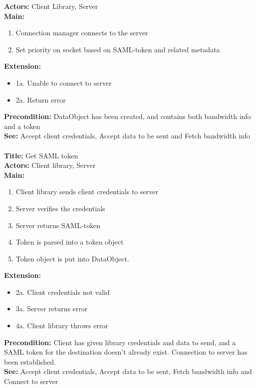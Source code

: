 		\textbf{Actors:} Client Library, Server \\
		\textbf{Main:}
		\begin{enumerate}	
			\item Connection manager connects to the server
			\item Set priority on socket based on SAML-token and related metadata
		\end{enumerate}
		\textbf{Extension:}
		\begin{itemize}
			  \item[] 1a. Unable to connect to server
			  \item[] 2a. Return error
		\end{itemize}
		\textbf{Precondition:} DataObject has been created, and contains both bandwidth info and a token \\
		\textbf{See:} Accept client credentials, Accept data to be sent and Fetch bandwidth info
		\\\\
		\textbf{Title:} Get SAML token \\
		\textbf{Actors:} Client library, Server \\
		\textbf{Main:}
		\begin{enumerate}
			\item Client library sends client credentials to server
			\item Server verifies the credentials
			\item Server returns SAML-token
			\item Token is parsed into a token object
			\item Token object is put into DataObject.
		\end{enumerate}
		\textbf{Extension:}
		\begin{itemize}
	        \item[] 2a. Client credentials not valid
			\item[] 3a. Server returns error
			\item[] 4a. Client library throws error
		\end{itemize}
		\textbf{Precondition:} Client has given library credentials and data to send, and a SAML token for the destination doesn’t already exist. Connection to server has been established. \\
		\textbf{See:} Accept client credentials, Accept data to be sent, Fetch bandwidth info and Connect to server
		\\\\
